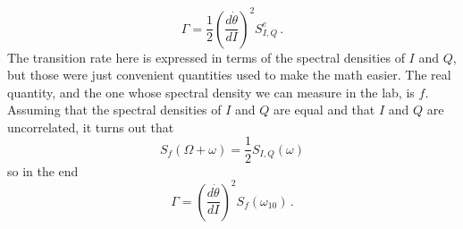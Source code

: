 \begin{equation}
\Gamma = \frac{1}{2} \left( \frac{d\dot{\theta}}{dI}\right)^2 S_{I,Q}^e \, .
\end{equation}
The transition rate here is expressed in terms of the spectral densities of $I$ and $Q$, but those were just convenient quantities used to make the math easier.
The real quantity, and the one whose spectral density we can measure in the lab, is $f$.
Assuming that the spectral densities of $I$ and $Q$ are equal and that $I$ and $Q$ are uncorrelated, it turns out that
\begin{equation}
S_f(\Omega + \omega) = \frac{1}{2}S_{I,Q}(\omega)
\end{equation}
so in the end
\begin{equation}
\Gamma = \left( \frac{d \dot{\theta}}{dI} \right)^2 S_f(\omega_{10}) \, .
\end{equation}

